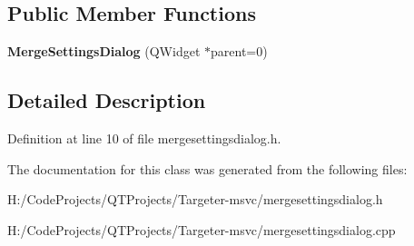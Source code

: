 \subsection*{Public Member Functions}
\begin{DoxyCompactItemize}
\item 
\mbox{\label{class_merge_settings_dialog_ab334a7e18beccbb9dcb385dfc3d74ba6}} 
{\bfseries Merge\+Settings\+Dialog} (Q\+Widget $\ast$parent=0)
\end{DoxyCompactItemize}


\subsection{Detailed Description}


Definition at line 10 of file mergesettingsdialog.\+h.



The documentation for this class was generated from the following files\+:\begin{DoxyCompactItemize}
\item 
H\+:/\+Code\+Projects/\+Q\+T\+Projects/\+Targeter-\/msvc/mergesettingsdialog.\+h\item 
H\+:/\+Code\+Projects/\+Q\+T\+Projects/\+Targeter-\/msvc/mergesettingsdialog.\+cpp\end{DoxyCompactItemize}
